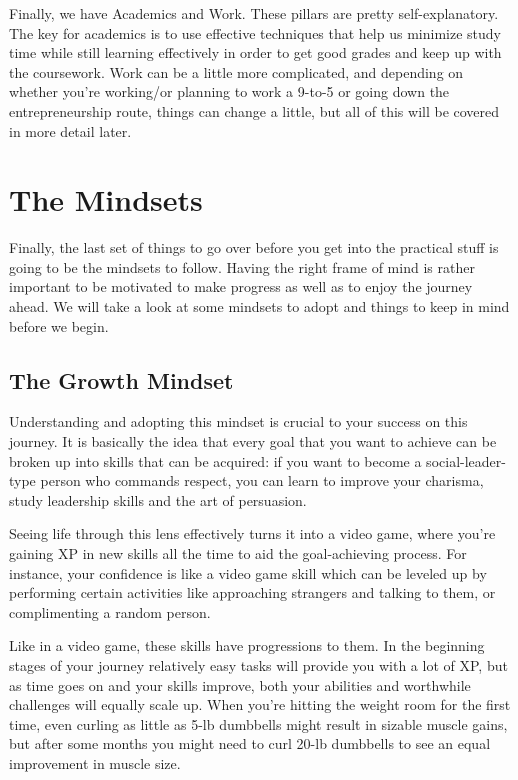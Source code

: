 \documentclass[
]{book}
\begin{document}
Finally, we have Academics and Work. These pillars are pretty self-explanatory. The key for academics is to use effective techniques that help us minimize study time while still learning effectively in order to get good grades and keep up with the coursework. Work can be a little more complicated, and depending on whether you're working/or planning to work a 9-to-5 or going down the entrepreneurship route, things can change a little, but all of this will be covered in more detail later.

\hypertarget{the-mindsets}{%
\chapter{The Mindsets}\label{the-mindsets}}

Finally, the last set of things to go over before you get into the practical stuff is going to be the mindsets to follow. Having the right frame of mind is rather important to be motivated to make progress as well as to enjoy the journey ahead. We will take a look at some mindsets to adopt and things to keep in mind before we begin.

\hypertarget{the-growth-mindset}{%
\section{The Growth Mindset}\label{the-growth-mindset}}

Understanding and adopting this mindset is crucial to your success on this journey. It is basically the idea that every goal that you want to achieve can be broken up into skills that can be acquired: if you want to become a social-leader-type person who commands respect, you can learn to improve your charisma, study leadership skills and the art of persuasion.

Seeing life through this lens effectively turns it into a video game, where you're gaining XP in new skills all the time to aid the goal-achieving process. For instance, your confidence is like a video game skill which can be leveled up by performing certain activities like approaching strangers and talking to them, or complimenting a random person.

Like in a video game, these skills have progressions to them. In the beginning stages of your journey relatively easy tasks will provide you with a lot of XP, but as time goes on and your skills improve, both your abilities and worthwhile challenges will equally scale up. When you're hitting the weight room for the first time, even curling as little as 5-lb dumbbells might result in sizable muscle gains, but after some months you might need to curl 20-lb dumbbells to see an equal improvement in muscle size.
\end{document}
